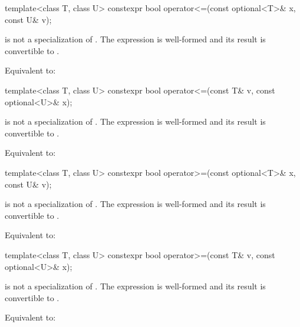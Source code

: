 %
\begin{itemdecl}
template<class T, class U> constexpr bool operator<=(const optional<T>& x, const U& v);
\end{itemdecl}

\begin{itemdescr}
\pnum
\constraints
{} is not a specialization of .
The expression  is well-formed and
its result is convertible to .

\pnum
\effects
Equivalent to: 
\end{itemdescr}

%
\begin{itemdecl}
template<class T, class U> constexpr bool operator<=(const T& v, const optional<U>& x);
\end{itemdecl}

\begin{itemdescr}
\pnum
\constraints
{} is not a specialization of .
The expression  is well-formed and
its result is convertible to .

\pnum
\effects
Equivalent to: 
\end{itemdescr}

%
\begin{itemdecl}
template<class T, class U> constexpr bool operator>=(const optional<T>& x, const U& v);
\end{itemdecl}

\begin{itemdescr}
\pnum
\constraints
{} is not a specialization of .
The expression  is well-formed and
its result is convertible to .

\pnum
\effects
Equivalent to: 
\end{itemdescr}

%
\begin{itemdecl}
template<class T, class U> constexpr bool operator>=(const T& v, const optional<U>& x);
\end{itemdecl}

\begin{itemdescr}
\pnum
\constraints
{} is not a specialization of .
The expression  is well-formed and
its result is convertible to .

\pnum
\effects
Equivalent to: 
\end{itemdescr}

